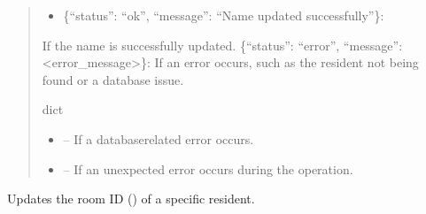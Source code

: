 \documentclass[letterpaper,10pt,english]{sphinxmanual}
\begin{document}
\begin{fulllineitems}
\begin{fulllineitems}
\begin{quote}
\begin{description}
\begin{itemize}
\end{itemize}

\sphinxAtStartPar
\begin{description}
\begin{itemize}
\item {} 
\sphinxAtStartPar
\{“status”: “ok”, “message”: “Name updated successfully”\}:

\end{itemize}

\sphinxAtStartPar
If the name is successfully updated.
\sphinxhyphen{} \{“status”: “error”, “message”: <error\_message>\}:
If an error occurs, such as the resident not being found or a database issue.

\end{description}


\sphinxAtStartPar
dict

\begin{itemize}
\item {} 
\sphinxAtStartPar
{} – If a database\sphinxhyphen{}related error occurs.

\item {} 
\sphinxAtStartPar
{} – If an unexpected error occurs during the operation.

\end{itemize}

\end{description}\end{quote}

\end{fulllineitems}


\begin{fulllineitems}
\label{\detokenize{app.controllers:app.controllers.resident_controller.ResidentController.updateResidentRoom}}
\pysigstartsignatures
\pysiglinewithargsret
{}
{\sphinxparamcomma {}\sphinxparamcomma {}}
{}
\pysigstopsignatures
\sphinxAtStartPar
Updates the room ID () of a specific resident.


\end{fulllineitems}
\end{fulllineitems}
\end{document}

